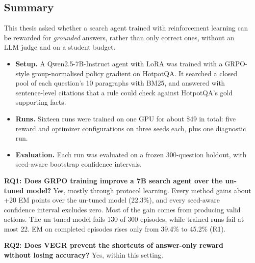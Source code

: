 
\subsection{Summary}\label{sec:5.1}

This thesis asked whether a search agent trained with reinforcement
learning can be rewarded for \emph{grounded} answers, rather than only
correct ones, without an LLM judge and on a student budget.

\begin{itemize}
\tightlist
\item
  \textbf{Setup.} A Qwen2.5-7B-Instruct agent with LoRA was trained with
  a GRPO-style group-normalised policy gradient on HotpotQA. It searched
  a closed pool of each question's 10 paragraphs with BM25, and answered
  with sentence-level citations that a rule could check against
  HotpotQA's gold supporting facts.
\item
  \textbf{Runs.} Sixteen runs were trained on one GPU for about \$49 in
  total: five reward and optimizer configurations on three seeds each,
  plus one diagnostic run.
\item
  \textbf{Evaluation.} Each run was evaluated on a frozen 300-question
  holdout, with seed-aware bootstrap confidence intervals.
\end{itemize}

\textbf{RQ1: Does GRPO training improve a 7B search agent over the
un-tuned model?} Yes, mostly through protocol learning. Every method
gains about +20 EM points over the un-tuned model (22.3\%), and every
seed-aware confidence interval excludes zero. Most of the gain comes
from producing valid actions. The un-tuned model fails 130 of 300
episodes, while trained runs fail at most 22. EM on completed episodes
rises only from 39.4\% to 45.2\% (R1).

\textbf{RQ2: Does VEGR prevent the shortcuts of answer-only reward
without losing accuracy?} Yes, within this setting.


